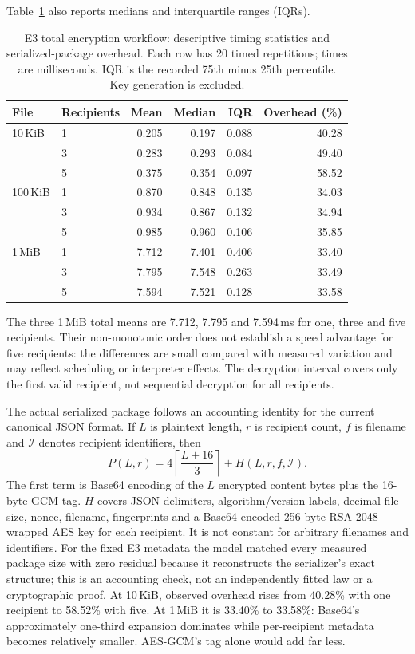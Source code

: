 Table~\ref{tab:e3} also reports medians and interquartile ranges (IQRs).

\begin{table}[!ht]
\centering\small
\caption{E3 total encryption workflow: descriptive timing statistics and serialized-package overhead. Each row has 20 timed repetitions; times are milliseconds. IQR is the recorded 75th minus 25th percentile. Key generation is excluded.}
\label{tab:e3}
\begin{tabular}{@{}llrrrr@{}}
\toprule
File & Recipients & Mean & Median & IQR & Overhead (\%) \\
\midrule
10\,KiB & 1 & 0.205 & 0.197 & 0.088 & 40.28 \\
        & 3 & 0.283 & 0.293 & 0.084 & 49.40 \\
        & 5 & 0.375 & 0.354 & 0.097 & 58.52 \\
100\,KiB & 1 & 0.870 & 0.848 & 0.135 & 34.03 \\
         & 3 & 0.934 & 0.867 & 0.132 & 34.94 \\
         & 5 & 0.985 & 0.960 & 0.106 & 35.85 \\
1\,MiB & 1 & 7.712 & 7.401 & 0.406 & 33.40 \\
        & 3 & 7.795 & 7.548 & 0.263 & 33.49 \\
        & 5 & 7.594 & 7.521 & 0.128 & 33.58 \\
\bottomrule
\end{tabular}
\end{table}
\FloatBarrier

The three 1\,MiB total means are 7.712, 7.795 and 7.594\,ms for one, three and five recipients. Their non-monotonic order does not establish a speed advantage for five recipients: the differences are small compared with measured variation and may reflect scheduling or interpreter effects. The decryption interval covers only the first valid recipient, not sequential decryption for all recipients.

The actual serialized package follows an accounting identity for the current canonical JSON format. If $L$ is plaintext length, $r$ is recipient count, $f$ is filename and $\mathcal I$ denotes recipient identifiers, then
\begin{equation}\label{eq:size}
P(L,r)=4\left\lceil\frac{L+16}{3}\right\rceil+H(L,r,f,\mathcal I).
\end{equation}
The first term is Base64 encoding of the $L$ encrypted content bytes plus the 16-byte GCM tag. $H$ covers JSON delimiters, algorithm/version labels, decimal file size, nonce, filename, fingerprints and a Base64-encoded 256-byte RSA-2048 wrapped AES key for each recipient. It is not constant for arbitrary filenames and identifiers. For the fixed E3 metadata the model matched every measured package size with zero residual because it reconstructs the serializer's exact structure; this is an accounting check, not an independently fitted law or a cryptographic proof. At 10\,KiB, observed overhead rises from 40.28\% with one recipient to 58.52\% with five. At 1\,MiB it is 33.40\% to 33.58\%: Base64's approximately one-third expansion dominates while per-recipient metadata becomes relatively smaller. AES-GCM's tag alone would add far less.
\FloatBarrier

